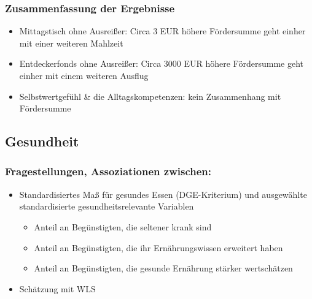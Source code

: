 \begin{frame}[fragile]
\frametitle{Zusammenfassung der Ergebnisse}

\begin{itemize}
\item Mittagstisch ohne Ausreißer: Circa 3 EUR höhere Fördersumme geht einher mit einer weiteren Mahlzeit
\item Entdeckerfonds ohne Ausreißer: Circa 3000 EUR höhere Fördersumme geht einher mit einem weiteren Ausflug
\item Selbstwertgefühl \& die Alltagskompetenzen: kein Zusammenhang mit Fördersumme
\end{itemize}

\end{frame}

\subsection{Gesundheit}

\begin{frame}[fragile]
\frametitle{Fragestellungen, Assoziationen zwischen:}
\begin{itemize}
\item Standardisiertes Maß für gesundes Essen (DGE-Kriterium) und ausgewählte standardisierte gesundheitsrelevante Variablen
\begin{itemize}
\item Anteil an Begünstigten, die seltener krank sind
\item Anteil an Begünstigten, die ihr Ernährungswissen erweitert haben
\item Anteil an Begünstigten, die gesunde Ernährung stärker wertschätzen
\end{itemize}
\item Schätzung mit WLS
\end{itemize}
\end{frame}

